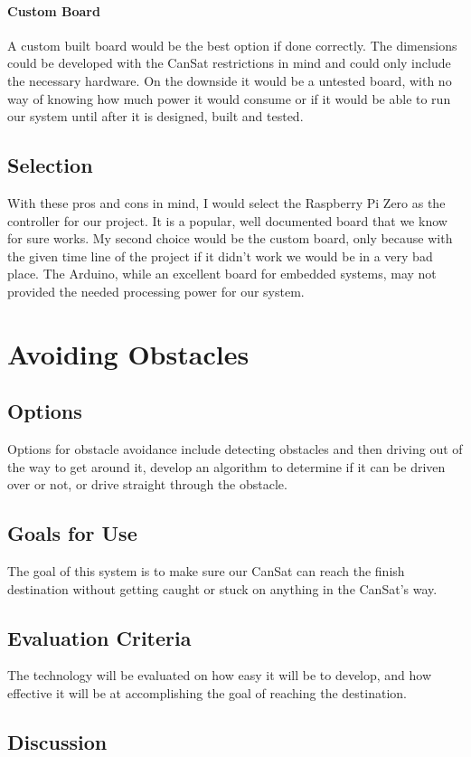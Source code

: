 \documentclass[10pt,letterpaper,onecolumn,journal]{IEEEtran}
\begin{document}
\paragraph{Custom Board}
A custom built board would be the best option if done correctly. The dimensions could be developed with the CanSat restrictions in mind and could only include the necessary hardware. On the downside it would be a untested board, with no way of knowing how much power it would consume or if it would be able to run our system until after it is designed, built and tested.
\subsection{Selection}
With these pros and cons in mind, I would select the Raspberry Pi Zero as the controller for our project. It is a popular, well documented board that we know for sure works. My second choice would be the custom board, only because with the given time line of the project if it didn't work we would be in a very bad place. The Arduino, while an excellent board for embedded systems, may not provided the needed processing power for our system.

	
\section{Avoiding Obstacles}
\subsection{Options}
Options for obstacle avoidance include detecting obstacles and then driving out of the way to get around it, develop an algorithm to determine if it can be driven over or not, or drive straight through the obstacle.
\subsection{Goals for Use}
The goal of this system is to make sure our CanSat can reach the finish destination without getting caught or stuck on anything in the CanSat's way.
\subsection{Evaluation Criteria}
The technology will be evaluated on how easy it will be to develop, and how effective it will be at accomplishing the goal of reaching the destination. 
\subsection{Discussion}
\end{document}
